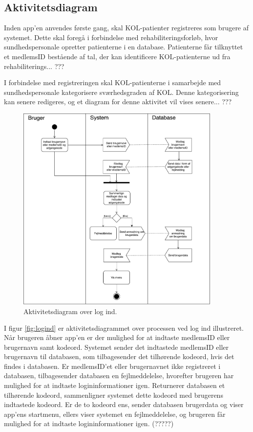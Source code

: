 \subsection{Aktivitetsdiagram}
Inden app'en anvendes første gang, skal KOL-patienter registreres som brugere af systemet. Dette skal foregå i forbindelse med rehabiliteringsforløb, hvor sundhedspersonale opretter patienterne i en database. Patienterne får tilknyttet et medlemsID bestående af tal, der kan identificere KOL-patienterne ud fra rehabiliterings... ???



I forbindelse med registreringen skal KOL-patienterne i samarbejde med sundhedspersonale kategorisere sværhedsgraden af KOL. Denne kategorisering kan senere redigeres, og et diagram for denne aktivitet vil vises senere... ???

 

\begin{figure} [H]
\centering
\includegraphics[width=0.9\textwidth]{figures/aktivitetsdiagram/Logind}
\caption{Aktivitetsdiagram over log ind.}
\label{fig:Logind}
\end{figure}

I figur \autoref{fig:logind} er aktivitetsdiagrammet over processen ved log ind illustreret. Når brugeren åbner app'en er der mulighed for at indtaste medlemsID eller brugernavn samt kodeord. Systemet sender det indtastede medlemsID eller brugernavn til databasen, som tilbagesender det tilhørende kodeord, hvis det findes i databasen. Er medlemsID'et eller brugernavnet ikke registreret i databasen, tilbagesender databasen en fejlmeddelelse, hvorefter brugeren har mulighed for at indtaste logininformationer igen. Returnerer databasen et tilhørende kodeord, sammenligner systemet dette kodeord med brugerens indtastede kodeord. Er de to kodeord ens, sender databasen brugerdata og viser app'ens startmenu, ellers viser systemet en fejlmeddelelse, og brugeren får mulighed for at indtaste logininformationer igen. (?????)



